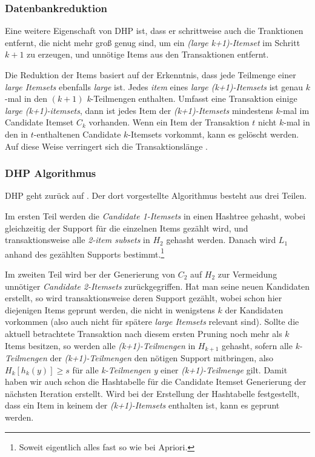 \subsubsection{Datenbankreduktion}
Eine weitere Eigenschaft von DHP ist, dass er schrittweise auch die Tranktionen
entfernt, die nicht mehr groß genug sind, um ein \textit{(large k+1)-Itemset}
im Schritt \(k+1\) zu erzeugen, und unnötige Items aus den Transaktionen entfernt.

Die Reduktion der Items basiert auf der Erkenntnis, dass jede Teilmenge einer 
\textit{large Itemsets} ebenfalls \textit{large} ist. Jedes \textit{item} eines
\textit{large (k+1)-Itemsets} ist genau \(k\)-mal in den \((k+1)\) \textit{k}-Teilmengen
enthalten. Umfasst eine Transaktion einige \textit{large (k+1)-itemsets}, dann ist jedes
Item der \textit{(k+1)-Itemsets} mindestens \(k\)-mal im Candidate Itemset \(C_k\)
vorhanden. Wenn ein Item der Transaktion \(t\) nicht \(k\)-mal in den in \(t\)-enthaltenen
Candidate \(k\)-Itemsets vorkommt, kann es gelöscht werden. Auf diese Weise
verringert sich die Transaktionslänge \citep{Petersohn05}.

\subsubsection{DHP Algorithmus}
DHP geht zurück auf \citet{Park95}. Der dort vorgestellte Algorithmus besteht aus
drei Teilen.

Im ersten Teil werden die \textit{Candidate 1-Itemsets} in einen Hashtree
gehasht, wobei gleichzeitig der Support für die einzelnen Items gezählt wird,
und transaktionsweise alle \textit{2-item subsets} in \(H_2\) gehasht werden. Danach
wird \(L_1\) anhand des gezählten Supports bestimmt.\footnote{Soweit eigentlich
alles fast so wie bei Apriori.}

Im zweiten Teil wird ber der Generierung von \(C_2\) auf \(H_2\) zur Vermeidung
unnötiger \textit{Candidate 2-Itemsets} zurückgegriffen. Hat man seine neuen 
Kandidaten erstellt, so wird transaktionsweise deren Support gezählt, wobei schon
hier diejenigen Items geprunt werden, die nicht in wenigstens \(k\) der Kandidaten
vorkommen (also auch nicht für spätere \textit{large Itemsets} relevant sind). Sollte
die aktuell betrachtete Transaktion nach diesem ersten Pruning noch mehr als \(k\)
Items besitzen, so werden alle \textit{(k+1)-Teilmengen} in \(H_{k+1}\) gehasht,
sofern alle \textit{k-Teilmengen} der \textit{(k+1)-Teilmengen} den nötigen Support
mitbringen, also \(H_k[h_k(y)] \geq s\) für alle \textit{k-Teilmengen y} einer
\textit{(k+1)-Teilmenge} gilt. Damit haben wir auch schon die Hashtabelle für die
Candidate Itemset Generierung der nächsten Iteration erstellt. Wird bei der
Erstellung der Hashtabelle festgestellt, dass ein Item in keinem der 
\textit{(k+1)-Itemsets} enthalten ist, kann es geprunt werden.

